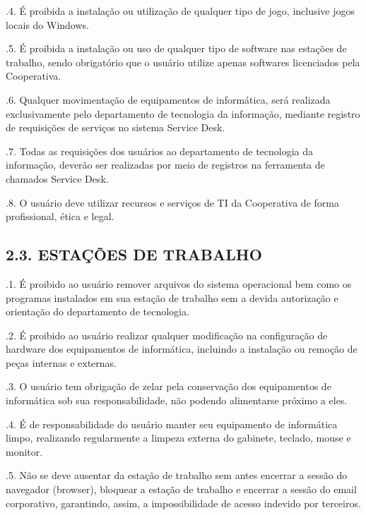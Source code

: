 \documentclass[letterpaper,10pt,brazil]{sphinxmanual}
\begin{document}
.4. É proibida a instalação ou utilização de qualquer tipo de jogo, inclusive jogos locais
do Windows.

.5. É proibida a instalação ou uso de qualquer tipo de software nas estações de trabalho,
sendo obrigatório que o usuário utilize apenas softwares licenciados pela Cooperativa.

.6. Qualquer movimentação de equipamentos de informática, será realizada
exclusivamente pelo departamento de tecnologia da informação, mediante registro de
requisições de serviços no sistema Service Desk.

.7. Todas as requisições dos usuários ao departamento de tecnologia da informação,
deverão ser realizadas por meio de registros na ferramenta de chamados Service Desk.

.8. O usuário deve utilizar recursos e serviços de TI da Cooperativa de forma
profissional, ética e legal.


\subsection{2.3. ESTAÇÕES DE TRABALHO}
\label{\detokenize{regras:id3}}
\sphinxAtStartPar
{}

.1. É proibido ao usuário remover arquivos do sistema operacional bem como os programas
instalados em sua estação de trabalho sem a devida autorização e orientação do departamento de tecnologia.

.2. É proibido ao usuário realizar qualquer modificação na configuração de hardware dos equipamentos
de informática, incluindo a instalação ou remoção de peças internas e externas.

.3. O usuário tem obrigação de zelar pela conservação dos equipamentos de informática sob sua responsabilidade,
não podendo alimentar\sphinxhyphen{}se próximo a eles.

.4. É de responsabilidade do usuário manter seu equipamento de informática limpo, realizando regularmente a
limpeza externa do gabinete, teclado, mouse e monitor.

.5. Não se deve ausentar da estação de trabalho sem antes encerrar a sessão do navegador (browser), bloquear a
estação de trabalho e encerrar a sessão do e\sphinxhyphen{}mail corporativo, garantindo, assim, a impossibilidade de acesso indevido por terceiros.
\end{document}
